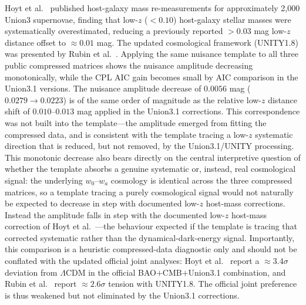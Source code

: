 \documentclass[11pt]{article}
\begin{document}
Hoyt et al.\ \cite{hoyt2026} published host-galaxy mass re-measurements for
approximately 2,000 Union3 supernovae, finding that low-$z$ ($<0.10$) host-galaxy
stellar masses were systematically overestimated, reducing a previously reported
$>0.03$ mag low-$z$ distance offset to $\approx0.01$ mag. The updated cosmological
framework (UNITY1.8) was presented by Rubin et al.\ \cite{rubin2026}. Applying the same
nuisance template to all three public compressed matrices shows the nuisance amplitude
decreasing monotonically, while the CPL AIC gain becomes small by AIC comparison in the
Union3.1 versions. The nuisance amplitude decrease of $0.0056$ mag
($0.0279\to0.0223$) is of the same order of magnitude as the relative low-$z$ distance
shift of $0.010$--$0.013$ mag applied in the Union3.1 corrections. This correspondence
was not built into the template---the amplitude emerged from fitting the compressed
data, and is consistent with the template tracing a low-$z$ systematic direction that
is reduced, but not removed, by the Union3.1/UNITY processing. This monotonic decrease
also bears directly on the central interpretive question of whether the template
absorbs a genuine systematic or, instead, real cosmological signal: the underlying
$w_0$--$w_a$ cosmology is identical across the three compressed matrices, so a template
tracing a purely cosmological signal would not naturally be expected to decrease in step with documented low-$z$ host-mass corrections. Instead
the amplitude falls in step with the documented low-$z$ host-mass correction of Hoyt
et al.\ \cite{hoyt2026}---the behaviour expected if the template is tracing that
corrected systematic rather than the dynamical-dark-energy signal. Importantly, this
comparison is a heuristic compressed-data diagnostic only and should not be conflated
with the updated official joint analyses: Hoyt et al.\ \cite{hoyt2026} report a
$\approx3.4\sigma$ deviation from $\Lambda$CDM in the official BAO$+$CMB$+$Union3.1
combination, and Rubin et al.\ \cite{rubin2026} report $\approx2.6\sigma$ tension with
UNITY1.8. The official joint preference is thus weakened but not eliminated by the
Union3.1 corrections.
\end{document}
